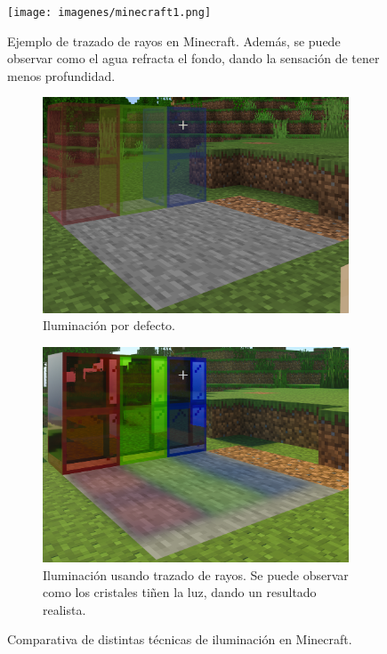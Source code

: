 \documentclass{article}
\begin{document}
\begin{figure}[H]
    \centering
    \texttt{[image: imagenes/minecraft1.png]}
    \caption{Ejemplo de trazado de rayos en Minecraft. Además, se puede observar como el agua refracta el fondo, dando la sensación de tener menos profundidad.}
 \end{figure}

\begin{figure}[H]
    \centering 
	\begin{subfigure}[H]{0.48\textwidth}
	    \centering
	    \includegraphics[width=\textwidth]{imagenes/minecraftvanilla.png}
        \caption{Iluminación por defecto.}
    \end{subfigure}
    \hfill
	\begin{subfigure}[H]{0.48\textwidth}
	    \centering
	    \includegraphics[width=\textwidth]{imagenes/minecraftrt.png}
        \caption{Iluminación usando trazado de rayos. Se puede observar como los cristales tiñen la luz, dando un resultado realista.}
    \end{subfigure}   
    \caption{Comparativa de distintas técnicas de iluminación en Minecraft.} 
\end{figure}
\end{document}
